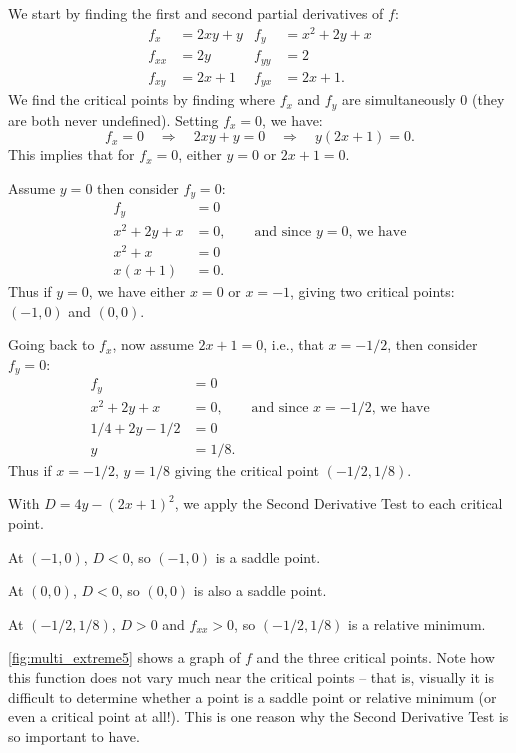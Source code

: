 {We start by finding the first and second partial derivatives of $f$:
\begin{align*}
f_x &= 2xy+y & f_y &= x^2+2y+x \\
f_{xx} &= 2y & f_{yy} &= 2\\
f_{xy} &= 2x+1 & f_{yx} &= 2x+1.
\end{align*}
We find the critical points by finding where $f_x$ and $f_y$ are simultaneously 0 (they are both never undefined). Setting $f_x=0$, we have:
\[f_x=0 \quad \Rightarrow \quad 2xy+y=0\quad \Rightarrow \quad y(2x+1)=0.\]
This implies that for $f_x=0$, either $y=0$ or $2x+1=0$.

Assume $y=0$ then consider $f_y=0$:
\begin{align*}
f_y &= 0\\
x^2+2y+x &= 0,  \qquad \text{and since $y=0$, we have}\\
x^2+x &= 0\\
x(x+1) & = 0.
\end{align*}
Thus if $y=0$, we have either $x=0$ or $x=-1$, giving two critical points: $(-1,0)$ and $(0,0)$. 

Going back to $f_x$, now assume $2x+1=0$, i.e., that $x=-1/2$, then consider $f_y=0$:
\begin{align*}
f_y &= 0\\
x^2+2y+x &= 0,  \qquad \text{and since $x=-1/2$, we have}\\
1/4+2y-1/2 &= 0\\
y&= 1/8.
\end{align*}
Thus if $x=-1/2$, $y=1/8$ giving the critical point $(-1/2,1/8)$. 

With $D = 4y-(2x+1)^2$, we apply the Second Derivative Test to each critical point.

At $(-1,0)$, $D <0$, so $(-1,0)$ is a saddle point.

At $(0,0)$, $D<0$, so $(0,0)$ is also a saddle point.

At $(-1/2,1/8)$, $D>0$ and $f_{xx} > 0$, so $(-1/2,1/8)$ is a relative minimum.

\autoref{fig:multi_extreme5} shows a graph of $f$ and the three critical points. Note how this function does not vary much near the critical points -- that is, visually it is difficult to determine whether a point is a saddle point or relative minimum (or even a critical point at all!). This is one reason why the Second Derivative Test is so important to have.}

